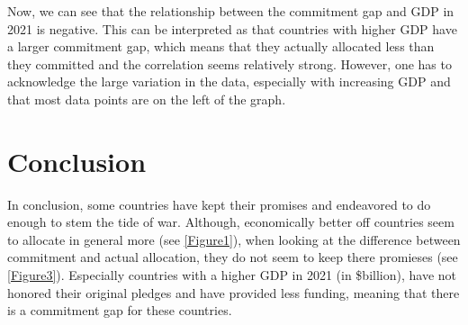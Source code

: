 \documentclass[11pt,preprint, authoryear]{elsarticle}
\numberwithin{equation}{section}
\numberwithin{figure}{section}
\numberwithin{table}{section}
\begin{document}
Now, we can see that the relationship between the commitment gap and GDP
in 2021 is negative. This can be interpreted as that countries with
higher GDP have a larger commitment gap, which means that they actually
allocated less than they committed and the correlation seems relatively
strong. However, one has to acknowledge the large variation in the data,
especially with increasing GDP and that most data points are on the left
of the graph.

\hypertarget{conclusion}{%
\section{Conclusion}\label{conclusion}}

In conclusion, some countries have kept their promises and endeavored to
do enough to stem the tide of war. Although, economically better off
countries seem to allocate in general more (see \ref{Figure1}), when
looking at the difference between commitment and actual allocation, they
do not seem to keep there promieses (see \ref{Figure3}). Especially
countries with a higher GDP in 2021 (in \$billion), have not honored
their original pledges and have provided less funding, meaning that
there is a commitment gap for these countries.


\end{document}
